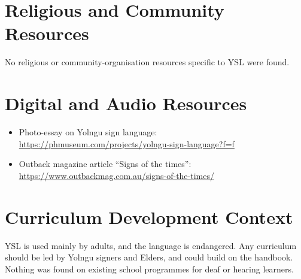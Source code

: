 \documentclass[12pt]{article}
\begin{document}
\section{Religious and Community Resources}
No religious or community-organisation resources specific to YSL were found.

\section{Digital and Audio Resources}
\begin{itemize}
\item Photo-essay on Yolngu sign language: \url{https://phmuseum.com/projects/yolngu-sign-language?f=f}
\item Outback magazine article ``Signs of the times'': \url{https://www.outbackmag.com.au/signs-of-the-times/}
\end{itemize}

\section{Curriculum Development Context}
YSL is used mainly by adults, and the language is endangered. Any curriculum should be led by Yolngu signers and Elders, and could build on the handbook. Nothing was found on existing school programmes for deaf or hearing learners.
\end{document}

